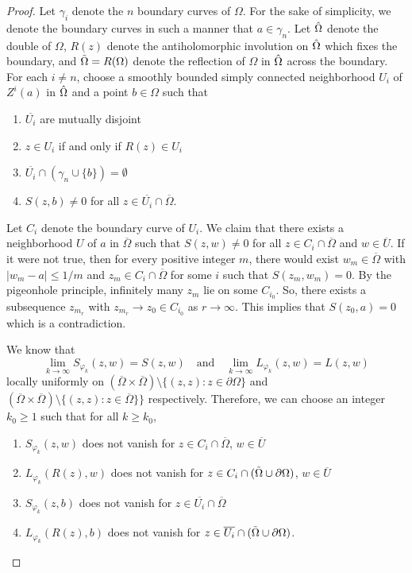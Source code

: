 \documentclass[10pt,a4paper]{amsart}
\newcommand{\Om}{\Omega}
\newcommand{\ov}{\overline}
\begin{document}
	\begin{proof}
		Let $\gamma_i$ denote the $n$ boundary curves of $\Om$. For the sake of simplicity, we denote the boundary curves in such a manner that $a\in \gamma_n$. 
		Let $\Hat{\Om}$ denote the double of $\Om$, $R(z)$ denote the antiholomorphic involution on $\Hat{\Om}$ which fixes the boundary, and $\Tilde{\Om} = R(\Om)$ denote the reflection of $\Om$ in $\Hat{\Om}$ across the boundary. For each $i\neq n$, choose a smoothly bounded simply connected neighborhood $U_i$ of $Z^i(a)$ in $\Hat{\Om}$ and a point $b\in \Om$ such that 
		
		\begin{enumerate}
			\item[(i)] $\overline{U_i}$ are mutually disjoint
			\item[(ii)] $z\in U_i$ if and only if $R(z)\in U_i$
			\item[(iii)] $\ov{U_i}\cap ({\gamma_n \cup \{b\}}) = \emptyset$ 
			\item[(iv)] $S(z,b) \neq 0$ for all $z\in \overline{U_i}\cap \ov{\Om}$.
		\end{enumerate}
		
		\medskip
		
		Let $C_i$ denote the boundary curve of $U_i$. We claim that there exists a neighborhood $U$ of $a$ in $\overline{\Om}$ such that $S(z,w)\neq 0$ for all $z\in C_i\cap \overline{\Om}$ and $w\in \ov{U}$. If it were not true, then for every positive integer $m$, there would exist $w_m\in\ov{\Om}$ with $\vert w_m - a\vert \leq 1/m$ and $z_m\in C_i\cap \overline{\Om}$ for some $i$ such that $S(z_m,w_m) = 0$. By the pigeonhole principle, infinitely many $z_m$ lie on some $C_{i_0}$. So, there exists a subsequence $z_{m_r}$ with $z_{m_r}\rightarrow z_0\in C_{i_0}$ as $r\rightarrow\infty$. This implies that $S(z_0,a) = 0$ which is a contradiction.
		
		\medskip
		
		We know that
		\begin{equation}\label{thms}
			\lim_{k\rightarrow\infty} S_{\varphi_k}(z,w) = S(z,w)
			\quad \text{and}\quad
			\lim_{k\rightarrow\infty} L_{\varphi_k}(z,w) = L(z,w)
		\end{equation}
		locally uniformly on $(\ov{\Om}\times\ov{\Om})\setminus \{(z,z): z\in\partial\Om\}$ and $(\ov{\Om}\times\ov{\Om})\setminus \{(z,z): z\in \overline{\Om}\}\}$ respectively. Therefore, we can choose an integer $k_0 \ge 1$ such that for all $k\geq k_0$, 
		
		\begin{enumerate}
			\item[(i)] $S_{\varphi_k}(z,w)$ does not vanish for $z\in C_i\cap \overline{\Om}$, $w\in \ov{U}$
			\item[(ii)] $L_{\varphi_k}(R(z),w)$ does not vanish for $z\in C_i\cap (\Tilde{\Om}\cup \partial\Om)$, $w\in \ov{U}$
			\item[(iii)] $S_{\varphi_k}(z,b)$ does not vanish for $z\in \ov{U_i}\cap \overline{\Om}$
			\item[(iv)] $L_{\varphi_k}(R(z),b)$ does not vanish for $z\in \ov{U_i}\cap (\Tilde{\Om}\cup \partial\Om)$.
		\end{enumerate}
		

\end{proof}
\end{document}
